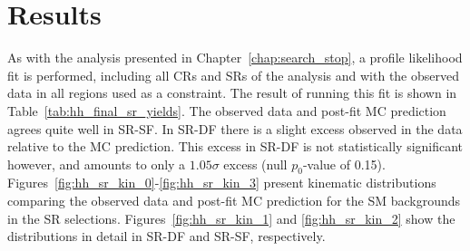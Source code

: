 \section{Results}
\label{sec:hh_results}

As with the analysis presented in Chapter~\ref{chap:search_stop}, a profile likelihood
fit is performed, including all CRs and SRs of the analysis and with the observed
data in all regions used as a constraint.
The result of running this fit is shown in Table~\ref{tab:hh_final_sr_yields}.
The observed data and post-fit MC prediction agrees quite well in SR-SF.
In SR-DF there is a slight excess observed in the data relative to the MC prediction.
This excess in SR-DF is not statistically significant however, and amounts to only a $1.05\sigma$ excess
(null $p_0$-value of 0.15).
Figures~\ref{fig:hh_sr_kin_0}-\ref{fig:hh_sr_kin_3} present kinematic distributions comparing
the observed data and post-fit MC prediction for the SM backgrounds in the SR selections.
Figures~\ref{fig:hh_sr_kin_1} and \ref{fig:hh_sr_kin_2} show the \dhh distributions in detail
in SR-DF and SR-SF, respectively.

